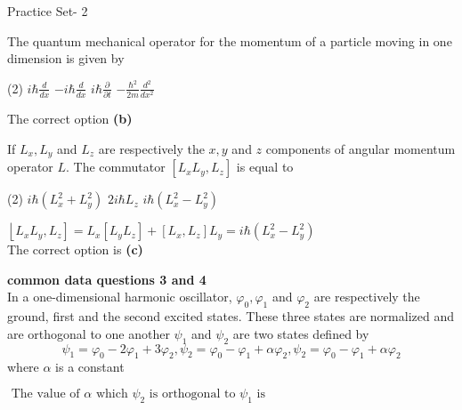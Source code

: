 \newpage
\begin{abox}
	Practice Set- 2 
	\end{abox}
\begin{enumerate}
\begin{minipage}{\textwidth}
	\item The quantum mechanical operator for the momentum of a particle moving in one dimension is given by
\end{minipage}
\begin{tasks}(2)
	\task[\textbf{A.}] $i \hbar \frac{d}{d x}$
	\task[\textbf{B.}]$-i \hbar \frac{d}{d x}$
	\task[\textbf{C.}]$i \hbar \frac{\partial}{\partial t}$
	\task[\textbf{D.}]$-\frac{\hbar^{2}}{2 m} \frac{d^{2}}{d x^{2}}$
\end{tasks}
\begin{answer}
	The correct option \textbf{(b)}
\end{answer}
\begin{minipage}{\textwidth}
	\item If $L_{x}, L_{y}$ and $L_{z}$ are respectively the $x, y$ and $z$ components of angular momentum operator $L$. The commutator $\left[L_{x} L_{y}, L_{z}\right]$ is equal to
\end{minipage}
\begin{tasks}(2)
	\task[\textbf{A.}] $i \hbar\left(L_{x}^{2}+L_{y}^{2}\right)$
	\task[\textbf{B.}]$2 i \hbar L_{z}$
	\task[\textbf{C.}]$i \hbar\left(L_{x}^{2}-L_{y}^{2}\right)$
\end{tasks}
\begin{answer}
$\left\lfloor L_{x} L_{y}, L_{z}\right]=L_{x}\left[L_{y} L_{z}\right]+\left[L_{x}, L_{z}\right] L_{y}=i \hbar\left(L_{x}^{2}-L_{y}^{2}\right)$\\
The correct option is \textbf{(c)}	
\end{answer}
\textbf{common data questions 3 and 4 }\\
In a one-dimensional harmonic oscillator, $\varphi_{0}, \varphi_{1}$ and $\varphi_{2}$ are respectively the ground, first and the second excited states. These three states are normalized and are orthogonal to one another $\psi_{1}$ and $\psi_{2}$ are two states defined by
$$
\psi_{1}=\varphi_{0}-2 \varphi_{1}+3 \varphi_{2}, \psi_{2}=\varphi_{0}-\varphi_{1}+\alpha \varphi_{2}, \psi_{2}=\varphi_{0}-\varphi_{1}+\alpha \varphi_{2}
$$
where $\alpha$ is a constant\\
\begin{minipage}{\textwidth}
	\item $\text { The value of } \alpha \text { which } \psi_{2} \text { is orthogonal to } \psi_{1} \text { is }$

\end{minipage}
\end{enumerate}
